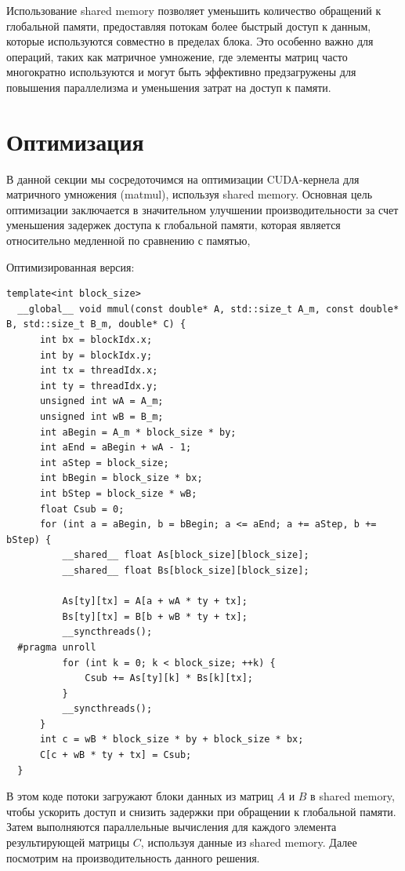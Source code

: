 \documentclass[a4paper,12pt]{article}
\begin{document}
Использование shared memory позволяет уменьшить количество обращений к 
глобальной памяти, предоставляя потокам более быстрый доступ к данным, 
которые используются совместно в пределах блока. 
Это особенно важно для операций, таких как матричное умножение, 
где элементы матриц часто многократно используются и могут быть 
эффективно предзагружены для повышения параллелизма 
и уменьшения затрат на доступ к памяти.

\newpage

\section{Оптимизация}
В данной секции мы сосредоточимся на оптимизации CUDA-кернела 
для матричного умножения (matmul), используя shared memory. 
Основная цель оптимизации заключается в значительном улучшении 
производительности за счет уменьшения задержек доступа к глобальной памяти, 
которая является относительно медленной по сравнению с памятью, 

Оптимизированная версия:

\vspace{10pt}
\begin{lstlisting}[language=CUDA, caption={optimized matmul}, label={code:cuda_matmul}]
  template<int block_size>
  __global__ void mmul(const double* A, std::size_t A_m, const double* B, std::size_t B_m, double* C) {
      int bx = blockIdx.x;
      int by = blockIdx.y;
      int tx = threadIdx.x;
      int ty = threadIdx.y;
      unsigned int wA = A_m;
      unsigned int wB = B_m;
      int aBegin = A_m * block_size * by;
      int aEnd = aBegin + wA - 1;
      int aStep = block_size;
      int bBegin = block_size * bx;
      int bStep = block_size * wB;
      float Csub = 0;
      for (int a = aBegin, b = bBegin; a <= aEnd; a += aStep, b += bStep) {
          __shared__ float As[block_size][block_size];
          __shared__ float Bs[block_size][block_size];
  
          As[ty][tx] = A[a + wA * ty + tx];
          Bs[ty][tx] = B[b + wB * ty + tx];
          __syncthreads();
  #pragma unroll
          for (int k = 0; k < block_size; ++k) {
              Csub += As[ty][k] * Bs[k][tx];
          }
          __syncthreads();
      }
      int c = wB * block_size * by + block_size * bx;
      C[c + wB * ty + tx] = Csub;
  }
\end{lstlisting}
\vspace{10pt} 
В этом коде потоки загружают блоки данных из матриц \(A\) и \(B\) в
shared memory, чтобы ускорить доступ и снизить задержки при
обращении к глобальной памяти. Затем выполняются параллельные вычисления
для каждого элемента результирующей матрицы \(C\), используя данные из
shared memory. Далее посмотрим на производительность данного решения.
\end{document}
